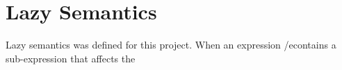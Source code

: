 \section{Lazy Semantics}

Lazy semantics was defined for this project.
When an expression /econtains a sub-expression that affects the 
